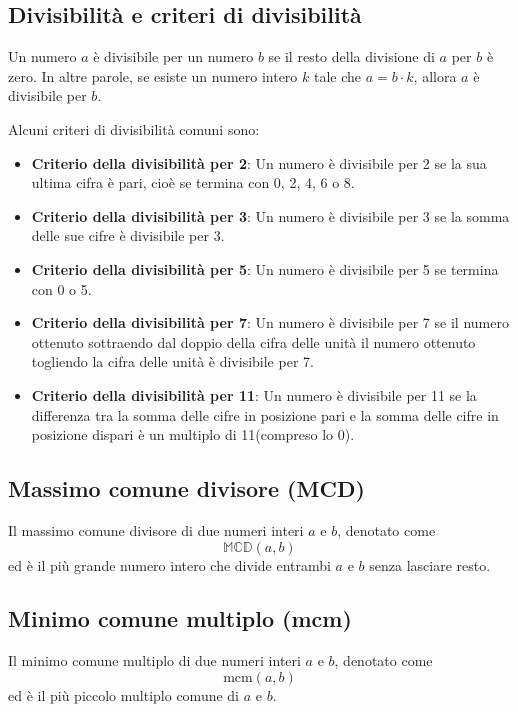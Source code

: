 \documentclass[a4paper,12pt]{report}
\begin{document}
\subsection*{Divisibilità e criteri di divisibilità}

Un numero \(a\) è divisibile per un numero \(b\) se il resto della divisione di \(a\) per \(b\) è zero. In altre parole, se esiste un numero intero \(k\) tale che \(a = b \cdot k\), allora \(a\) è divisibile per \(b\).

Alcuni criteri di divisibilità comuni sono:
\begin{itemize}
	\item \textbf{Criterio della divisibilità per 2}: Un numero è divisibile per 2 se la sua ultima cifra è pari, cioè se termina con 0, 2, 4, 6 o 8.
	
	\item \textbf{Criterio della divisibilità per 3}: Un numero è divisibile per 3 se la somma delle sue cifre è divisibile per 3.
	
	\item \textbf{Criterio della divisibilità per 5}: Un numero è divisibile per 5 se termina con 0 o 5.
	
	\item \textbf{Criterio della divisibilità per 7}: Un numero è divisibile per 7 se il numero ottenuto sottraendo dal doppio della cifra delle unità il numero ottenuto togliendo la cifra delle unità è divisibile per 7.

	\item \textbf{Criterio della divisibilità per 11}: Un numero è divisibile per 11 se la differenza tra la somma delle cifre in posizione pari e la somma delle cifre in posizione dispari è un multiplo di 11(compreso lo 0).

\end{itemize}

\subsection*{Massimo comune divisore (MCD)}
Il massimo comune divisore di due numeri interi \( a \) e \( b \), denotato come 
\[ \mathbb{MCD}(a, b) \] 
ed è il più grande numero intero che divide entrambi \( a \) e \( b \) senza lasciare resto.

\subsection*{Minimo comune multiplo (mcm)}
Il minimo comune multiplo di due numeri interi \( a \) e \( b \), denotato come 
\[ \mathrm{mcm}(a, b) \]
ed è il più piccolo multiplo comune di \( a \) e \( b \).
\end{document}
